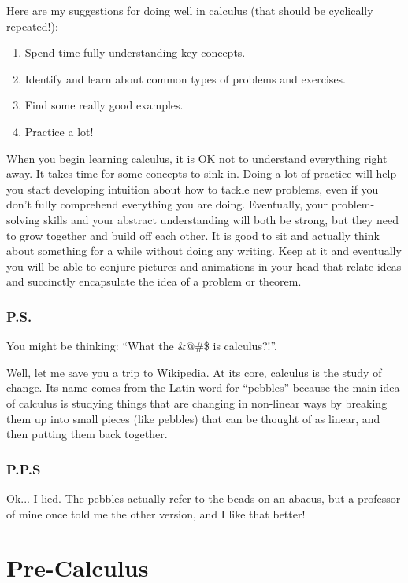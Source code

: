 \documentclass{article}
\theoremstyle{definition}
\theoremstyle{definition}
\begin{document}
Here are my suggestions for doing well in calculus (that should be cyclically repeated!):

\begin{enumerate}
\item Spend time fully understanding key concepts.
\item Identify and learn about common types of problems and exercises.
\item Find some really good examples.
\item Practice a lot!
\end{enumerate}

When you begin learning calculus, it is OK not to understand everything right away. It takes time for some concepts to sink in. Doing a lot of practice will help you start developing intuition about how to tackle new problems, even if you don't fully comprehend everything you are doing. Eventually, your problem-solving skills and your abstract understanding will both be strong, but they need to grow together and build off each other. It is good to sit and actually think about something for a while without doing any writing. Keep at it and eventually you will be able to conjure pictures and animations in your head that relate ideas and succinctly encapsulate the idea of a problem or theorem.


\section*{P.S.}
You might be thinking: ``What the \&@\#\$ is calculus?!''.

Well, let me save you a trip to Wikipedia. At its core, calculus is the study of change. Its name comes from the Latin word for ``pebbles'' because the main idea of calculus is studying things that are changing in non-linear ways by breaking them up into small pieces (like pebbles) that can be thought of as linear, and then putting them back together.

\section*{P.P.S}
Ok... I lied. The pebbles actually refer to the beads on an abacus, but a professor of mine once told me the other version, and I like that better!





\newpage
\part{Pre-Calculus}
\end{document}
